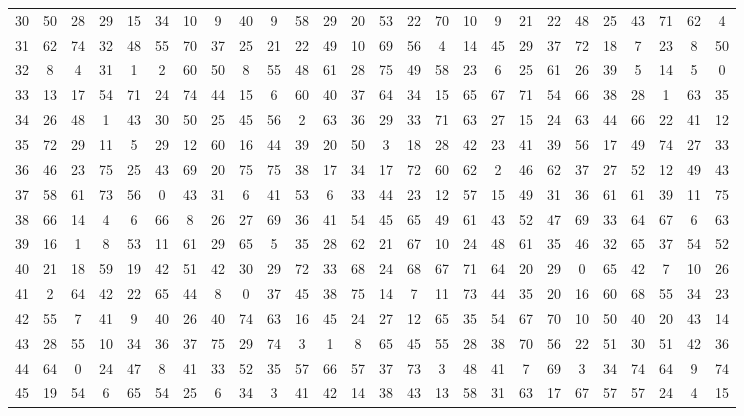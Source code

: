 \begin{table}
\begin{tabular}{c c c c c c c c c c c c c c c c c c c c c c c c c c }
30 & 50 & 28 & 29 & 15 & 34 & 10 & 9 & 40 & 9 & 58 & 29 & 20 & 53 & 22 & 70 & 10 & 9 & 21 & 22 & 48 & 25 & 43 & 71 & 62 & 4 \\
31 & 62 & 74 & 32 & 48 & 55 & 70 & 37 & 25 & 21 & 22 & 49 & 10 & 69 & 56 & 4 & 14 & 45 & 29 & 37 & 72 & 18 & 7 & 23 & 8 & 50 \\
32 & 8 & 4 & 31 & 1 & 2 & 60 & 50 & 8 & 55 & 48 & 61 & 28 & 75 & 49 & 58 & 23 & 6 & 25 & 61 & 26 & 39 & 5 & 14 & 5 & 0 \\
33 & 13 & 17 & 54 & 71 & 24 & 74 & 44 & 15 & 6 & 60 & 40 & 37 & 64 & 34 & 15 & 65 & 67 & 71 & 54 & 66 & 38 & 28 & 1 & 63 & 35 \\
34 & 26 & 48 & 1 & 43 & 30 & 50 & 25 & 45 & 56 & 2 & 63 & 36 & 29 & 33 & 71 & 63 & 27 & 15 & 24 & 63 & 44 & 66 & 22 & 41 & 12 \\
35 & 72 & 29 & 11 & 5 & 29 & 12 & 60 & 16 & 44 & 39 & 20 & 50 & 3 & 18 & 28 & 42 & 23 & 41 & 39 & 56 & 17 & 49 & 74 & 27 & 33 \\
36 & 46 & 23 & 75 & 25 & 43 & 69 & 20 & 75 & 75 & 38 & 17 & 34 & 17 & 72 & 60 & 62 & 2 & 46 & 62 & 37 & 27 & 52 & 12 & 49 & 43 \\
37 & 58 & 61 & 73 & 56 & 0 & 43 & 31 & 6 & 41 & 53 & 6 & 33 & 44 & 23 & 12 & 57 & 15 & 49 & 31 & 36 & 61 & 61 & 39 & 11 & 75 \\
38 & 66 & 14 & 4 & 6 & 66 & 8 & 26 & 27 & 69 & 36 & 41 & 54 & 45 & 65 & 49 & 61 & 43 & 52 & 47 & 69 & 33 & 64 & 67 & 6 & 63 \\
39 & 16 & 1 & 8 & 53 & 11 & 61 & 29 & 65 & 5 & 35 & 28 & 62 & 21 & 67 & 10 & 24 & 48 & 61 & 35 & 46 & 32 & 65 & 37 & 54 & 52 \\
40 & 21 & 18 & 59 & 19 & 42 & 51 & 42 & 30 & 29 & 72 & 33 & 68 & 24 & 68 & 67 & 71 & 64 & 20 & 29 & 0 & 65 & 42 & 7 & 10 & 26 \\
41 & 2 & 64 & 42 & 22 & 65 & 44 & 8 & 0 & 37 & 45 & 38 & 75 & 14 & 7 & 11 & 73 & 44 & 35 & 20 & 16 & 60 & 68 & 55 & 34 & 23 \\
42 & 55 & 7 & 41 & 9 & 40 & 26 & 40 & 74 & 63 & 16 & 45 & 24 & 27 & 12 & 65 & 35 & 54 & 67 & 70 & 10 & 50 & 40 & 20 & 43 & 14 \\
43 & 28 & 55 & 10 & 34 & 36 & 37 & 75 & 29 & 74 & 3 & 1 & 8 & 65 & 45 & 55 & 28 & 38 & 70 & 56 & 22 & 51 & 30 & 51 & 42 & 36 \\
44 & 64 & 0 & 24 & 47 & 8 & 41 & 33 & 52 & 35 & 57 & 66 & 57 & 37 & 73 & 3 & 48 & 41 & 7 & 69 & 3 & 34 & 74 & 64 & 9 & 74 \\
45 & 19 & 54 & 6 & 65 & 54 & 25 & 6 & 34 & 3 & 41 & 42 & 14 & 38 & 43 & 13 & 58 & 31 & 63 & 17 & 67 & 57 & 57 & 24 & 4 & 15 \\

\end{tabular}
\end{table}
